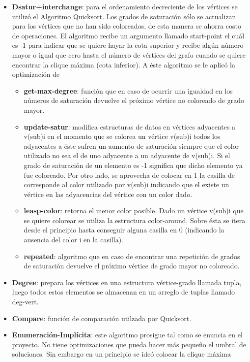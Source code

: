 \documentclass[a4paper,10pt]{article}
\begin{document}
\begin{itemize}
 \item \textbf{Dsatur+interchange}: para el ordenamiento decreciente de los vértices se utilizó el Algoritmo Quicksort. Los 
grados de saturación sólo se actualizan para los vértices que no han sido coloreados, de esta manera se ahorra costo 
de operaciones. El algoritmo recibe un argumento llamado start-point el cuál es -1 para indicar que se quiere hayar 
la cota superior y recibe algún número mayor o igual que cero hasta el número de vértices del grafo cuando se quiere encontrar 
la clique máxima (cota inferior). A éste algoritmo se le aplicó la optimización de 
\begin{itemize}
 \item \textbf{get-max-degree}: función que en caso de ocurrir una igualdad en los números de saturación devuelve el próximo
vértice no coloreado de grado mayor.
\item \textbf{update-satur}: modifica estructuras de datos en vértices adyacentes a v(sub)i en el momento que se colorea un vértice v(sub)i todos los adyacentes a éste sufren un aumento 
de saturación siempre que el color utilizado no sea el de uno adyacente a un adyacente de v(sub)i. Si el grado 
de saturación de un elemento es -1 significa que dicho elemento ya fue coloreado. Por otro lado, se aprovecha de 
colocar en 1 la casilla de corresponde al color utilizado por v(sub)i indicando que el existe un vértice en las adyacencias del vértice con un color dado.
 \item \textbf{leasp-color}: retorna el menor color posible. Dado un vértice v(sub)i que se quiere colorear se utiliza la estructura color-around. Sobre ésta se itera desde el principio hasta conseguir alguna casilla en 0 (indicando la ausencia del color i en la casilla).
\item \textbf{repeated}: algoritmo que en caso de encontrar una repetición de grados de saturación devuelve el próximo vértice de grado mayor no coloreado.
\end{itemize}
\item \textbf{Degree}: prepara los vértices en una estructura vértice-grado llamada tupla, luego todos estos elementos se almacenan en un arreglo de tuplas llamado deg-vert.
\item \textbf{Compare}: función de comparación utilzada por Quicksort.
 \item \textbf{Enumeración-Implícita}: este algoritmo prosigue tal como se enuncia en el proyecto. No tiene optimizaciones 
  que pueda hacer más pequeño el umbral de soluciones. Sin embargo en un principio se ideó colocar la clique máxima 

\end{itemize}
\end{document}
